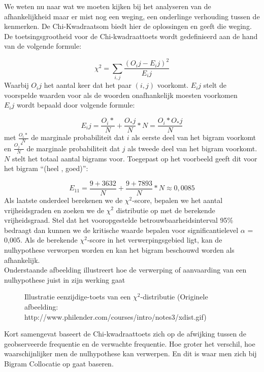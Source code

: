 \newline
We weten nu naar wat we moeten kijken bij het analyseren van de afhankelijkheid maar er mist nog een weging, een onderlinge verhouding tussen de kenmerken. 
%
De Chi-Kwadraatsom biedt hier de oplossingen en geeft die weging. De toetsingsgrootheid voor de Chi-kwadraattoets wordt gedefinieerd aan de hand van de volgende formule:

\[{\chi}^2=\sum_{i,j}^{} \frac{(O_ij - E_ij)^2}{E_ij}\]
%
Waarbij ${O_ij}$ het aantal keer dat het paar $(i,j)$ voorkomt. $E_ij$ stelt de voorspelde waarden voor als de woorden onafhankelijk moesten voorkomen\\
$E_ij$ wordt bepaald door volgende formule:

\[{E_ij}= \frac{O_i*}{N} + \frac{O_*j}{N} * N = \frac{O_i* O_*j}{N} \]
%
met $\frac{O_i*}{N}$ de marginale probabiliteit dat $i$ als eerste deel van het bigram voorkomt en $\frac{O_j*}{N}$ de marginale probabiliteit dat $j$ als tweede deel van het bigram voorkomt. $N$ stelt het totaal aantal bigrams voor.
%
Toegepast op het voorbeeld geeft dit voor het bigram ``(heel , goed)'':

\[{E_11} = \frac{9+3632}{N}+\frac{9+7893}{N} * N \approx 0,0085 \]
\newline
Als laatste onderdeel berekenen we de ${\chi}^2$-score, bepalen we het aantal vrijheidsgraden en zoeken we de ${\chi}^2$ distributie op met de berekende vrijheidsgraad. Stel dat het vooropgestelde betrouwbaarheidsinterval 95\% bedraagt dan kunnen we de kritische waarde bepalen voor significantielevel $\alpha$ = 0,005.
Als de berekende ${\chi}^2$-score in het verwerpingsgebied ligt, kan de nulhypothese verworpen worden en kan het bigram beschouwd worden als afhankelijk.\\
%
Onderstaande afbeelding illustreert hoe de verwerping of aanvaarding van een nulhypothese juist in zijn werking gaat
%
\begin{figure}[h]%
    \centering
    \caption{Illustratie eenzijdige-toets van een ${\chi}^2$-distributie (Originele afbeelding: http://www.philender.com/courses/intro/notes3/xdist.gif)}%
\end{figure}
\newline
Kort samengevat baseert de Chi-kwadraattoets zich op de afwijking tussen de geobserveerde frequentie en de verwachte frequentie. Hoe groter het verschil, hoe waarschijnlijker men de nulhypothese kan verwerpen. En dit is waar men zich bij Bigram Collocatie op gaat baseren.

